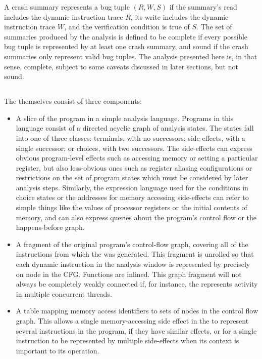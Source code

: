 A crash summary represents a bug tuple $(R, W, S)$ if the summary's read \StateMachine includes the dynamic instruction trace $R$, its write \StateMachine includes the dynamic instruction trace $W$, and the verification condition is true of $S$.
The set of summaries produced by the analysis is defined to be complete if every possible bug tuple is represented by at least one crash summary, and sound if the crash summaries only represent valid bug tuples.
The analysis presented here is, in that sense, complete, subject to some caveats discussed in later sections, but not sound.

\subsection{\STateMachines}

The \StateMachines themselves consist of three components:

\begin{itemize}
\item
  A slice of the program in a simple analysis language.  Programs in
  this language consist of a directed acyclic graph of analysis
  states.  The states fall into one of three classes: terminals, with
  no successors; side-effects, with a single successor; or choices,
  with two successors.  The side-effects can express obvious
  program-level effects such as accessing memory or setting a
  particular register, but also less-obvious ones such as register
  aliasing configurations or restrictions on the set of program states
  which must be considered by later analysis steps.  Similarly, the
  expression language used for the conditions in choice states or the
  addresses for memory accessing side-effects can refer to simple
  things like the values of processor registers or the initial
  contents of memory, and can also express queries about the program's
  control flow or the happens-before graph.
\item
  A fragment of the original program's control-flow graph, covering
  all of the instructions from which the \StateMachine was generated.
  This fragment is unrolled so that each dynamic instruction in the
  analysis window is represented by precisely on node in the
  CFG.  Functions are inlined.  This graph fragment
  will not always be completely weakly connected if, for instance, the
  \StateMachine represents activity in multiple concurrent threads.
\item
  A table mapping memory access identifiers to sets of nodes in the
  control flow graph. This allows a single memory-accessing side
  effect in the \StateMachine{} to represent several instructions in
  the program, if they have similar effects, or for a single instruction to be represented by
  multiple side-effects when its context is important to its
  operation.
\end{itemize}

